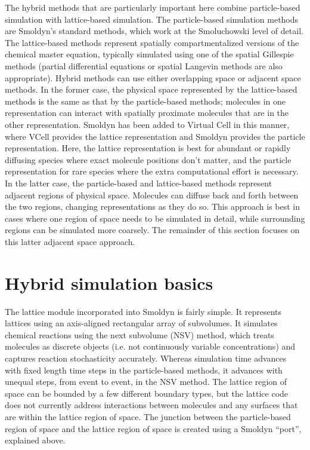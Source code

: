 \documentclass {book}
\begin{document}
The hybrid methods that are particularly important here combine particle-based simulation with lattice-based simulation. The particle-based simulation methods are Smoldyn's standard methods, which work at the Smoluchowski level of detail. The lattice-based methods represent spatially compartmentalized versions of the chemical master equation, typically simulated using one of the spatial Gillespie methods (partial differential equations or spatial Langevin methods are also appropriate). Hybrid methods can use either overlapping space or adjacent space methods. In the former case, the physical space represented by the lattice-based methods is the same as that by the particle-based methods; molecules in one representation can interact with spatially proximate molecules that are in the other representation. Smoldyn has been added to Virtual Cell in this manner, where VCell provides the lattice representation and Smoldyn provides the particle representation. Here, the lattice representation is best for abundant or rapidly diffusing species where exact molecule positions don't matter, and the particle representation for rare species where the extra computational effort is necessary. In the latter case, the particle-based and lattice-based methods represent adjacent regions of physical space. Molecules can diffuse back and forth between the two regions, changing representations as they do so. This approach is best in cases where one region of space needs to be simulated in detail, while surrounding regions can be simulated more coarsely. The remainder of this section focuses on this latter adjacent space approach.

\section{Hybrid simulation basics}

The lattice module incorporated into Smoldyn is fairly simple. It represents lattices using an axis-aligned rectangular array of subvolumes. It simulates chemical reactions using the next subvolume (NSV) method, which treats molecules as discrete objects (i.e. not continuously variable concentrations) and captures reaction stochasticity accurately. Whereas simulation time advances with fixed length time steps in the particle-based methods, it advances with unequal steps, from event to event, in the NSV method. The lattice region of space can be bounded by a few different boundary types, but the lattice code does not currently address interactions between molecules and any surfaces that are within the lattice region of space. The junction between the particle-based region of space and the lattice region of space is created using a Smoldyn ``port'', explained above.
\end{document}

